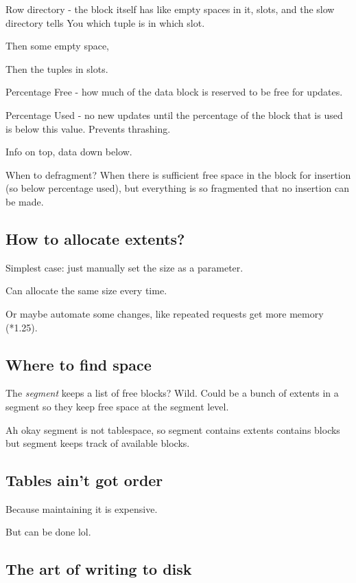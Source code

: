 \documentclass{article}
\begin{document}
			Row directory - the block itself has like empty spaces in it, slots, and the slow directory tells You which tuple is in which slot.
			
			Then some empty space,
			
			Then the tuples in slots.
			
			Percentage Free - how much of the data block is reserved to be free for updates.
			
			Percentage Used - no new updates until the percentage of the block that is used is below this value. Prevents thrashing. 
			
			Info on top, data down below.
			
			When to defragment? When there is sufficient free space in the block for insertion (so below percentage used), but everything is so fragmented that no insertion can be made.
			
		\subsection{How to allocate extents?}
		
			Simplest case: just manually set the size as a parameter.
			
			Can allocate the same size every time.
			
			Or maybe automate some changes, like repeated requests get more memory (*1.25).
			
		\subsection{Where to find space}
		
			The \textit{segment} keeps a list of free blocks? Wild. Could be a bunch of extents in a segment so they keep free space at the segment level.
			
			Ah okay segment is not tablespace, so segment contains extents contains blocks but segment keeps track of available blocks.
			
		\subsection{Tables ain't got order}
		
			Because maintaining it is expensive.
			
			But can be done lol.
			
		\subsection{The art of writing to disk}
		
\end{document}
